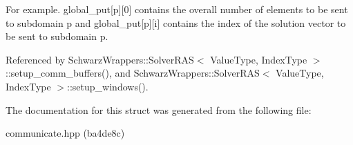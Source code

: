 For example. global\+\_\+put\mbox{[}p\mbox{]}\mbox{[}0\mbox{]} contains the overall number of elements to be sent to subdomain p and global\+\_\+put\mbox{[}p\mbox{]}\mbox{[}i\mbox{]} contains the index of the solution vector to be sent to subdomain p. 

Referenced by Schwarz\+Wrappers\+::\+Solver\+R\+A\+S$<$ Value\+Type, Index\+Type $>$\+::setup\+\_\+comm\+\_\+buffers(), and Schwarz\+Wrappers\+::\+Solver\+R\+A\+S$<$ Value\+Type, Index\+Type $>$\+::setup\+\_\+windows().



The documentation for this struct was generated from the following file\+:\begin{DoxyCompactItemize}
\item 
communicate.\+hpp (ba4de8c)\end{DoxyCompactItemize}
